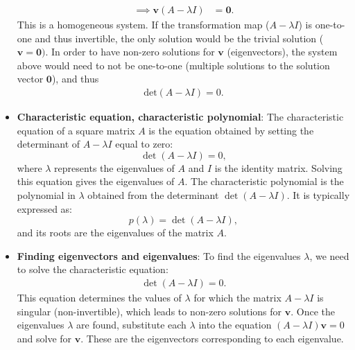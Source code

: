 \documentclass{report}
\begin{document}
\begin{itemize}
\begin{align*}
                \implies \mathbf{v}(A-\lambda I) &= \mathbf{0}
            .\end{align*}
            \bigbreak \noindent 
            This is a homogeneous system. If the transformation map ($A-\lambda I$) is one-to-one and thus invertible, the only solution would be the trivial solution ($\mathbf{v}  = \mathbf{0})$. In order to have non-zero solutions for $\mathbf{v}$ (eigenvectors), the system above would need to not be one-to-one (multiple solutions to the solution vector $\mathbf{0}$), and thus
            \begin{align*}
                \text{det}(A - \lambda I) = 0
            .\end{align*}
        \item \textbf{Characteristic equation, characteristic polynomial}:
        The characteristic equation of a square matrix \( A \) is the equation obtained by setting the determinant of \( A - \lambda I \) equal to zero:
            \[
                \det(A - \lambda I) = 0,
            \]
            where \( \lambda \) represents the eigenvalues of \( A \) and \( I \) is the identity matrix. Solving this equation gives the eigenvalues of \( A \).
             The characteristic polynomial is the polynomial in \( \lambda \) obtained from the determinant \( \det(A - \lambda I) \). It is typically expressed as:
            \[
                p(\lambda) = \det(A - \lambda I),
            \]
            and its roots are the eigenvalues of the matrix \( A \).

        \item \textbf{Finding eigenvectors and eigenvalues}: To find the eigenvalues $\lambda$, we need to solve the characteristic equation:
            \begin{align*}
                \det(A - \lambda I) =0
            .\end{align*}
            \bigbreak \noindent 
            This equation determines the values of $\lambda$ for which the matrix $A-\lambda I$ is singular (non-invertible), which leads to non-zero solutions for $\mathbf{v}$.
            \bigbreak \noindent 
            Once the eigenvalues $\lambda$ are found, substitute each $\lambda$ into the equation $(A-\lambda I)\mathbf{v}=0$ and solve for $\mathbf{v}$. These are the eigenvectors corresponding to each eigenvalue.


            

    \end{itemize}

    \pagebreak 
\end{document}
